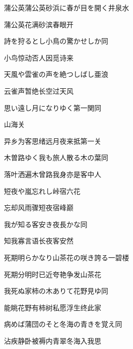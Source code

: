 \begin{haiku}
    {\FH 蒲公英蒲公英砂浜に春が目を開く}\hfill{\FH 井泉水}

    {\FK 蒲公英花满砂滨春眼开}
\end{haiku}

\begin{haiku}
    {\FH 詩を狩るとし小鳥の驚かせしか}\hfill{\FH 同}

    {\FK 小鸟惊动否人因觅诗来}
\end{haiku}

\begin{haiku}
    {\FH 天風や雲雀の声を絶つしばし}\hfill{\FH 亜浪}

    {\FK 云雀声暂绝长空过天风}
\end{haiku}

\begin{haiku}
    {\FH 思い遠し月になりゆく第一関}\hfill{\FH 同}

    {\FK 山海关}

    {\FK 异乡为客思绪远月夜来抵第一关}
\end{haiku}

\begin{haiku}
    {\FH 木曽路ゆく我も旅人散る木の葉}\hfill{\FH 同}

    {\FK 落叶洒遍木曾路我身亦是客中人}
\end{haiku}

\begin{haiku}
    {\FH 短夜や嵐忘れし峠宿}\hfill{\FH 六花}

    {\FK 忘却风雨骤短夜宿峰巅}
\end{haiku}

\begin{haiku}
    {\FH 我が知る客安き夜長かな}\hfill{\FH 同}

    {\FK 知我寡言语长夜客安然}
\end{haiku}

\begin{haiku}
    {\FH 死期明らかなり山茶花の咲き誇る}\hfill{\FH 一碧楼}

    {\FK 死期分明时已近夸艳争发山茶花}
\end{haiku}

\begin{haiku}
    {\FH 我死ぬ家柿の木ありて花野見ゆ}\hfill{\FH 同}

    {\FK 能眺花野有柿树私愿浮生终此家}
\end{haiku}

\begin{haiku}
    {\FH 病めば蒲団のそと冬海の青きを覚え}\hfill{\FH 同}

    {\FK 沾疾静卧被褥内青翠冬海入我思}
\end{haiku}

